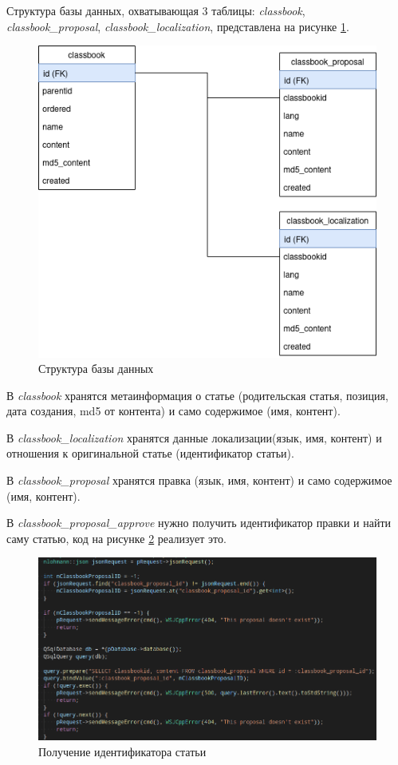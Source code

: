 Структура базы данных, охватывающая 3 таблицы: \emph{classbook}, \\ 
\emph{classbook\_proposal}, \emph{classbook\_localization}, представлена на рисунке \ref{fig:db_classbook}.

\begin{figure}[!h]
    \centering
    \includegraphics[width=0.6\linewidth]{images/db_classbook.png}
    \caption{Структура базы данных}
    \label{fig:db_classbook}
\end{figure}

В \emph{classbook} хранятся метаинформация о статье (родительская статья, позиция, 
дата создания, md5 от контента) и само содержимое (имя, контент).

В \emph{classbook\_localization} хранятся данные локализации(язык, имя, контент)
и отношения к оригинальной статье (идентификатор статьи).

В \emph{classbook\_proposal} хранятся правка (язык, имя, контент) и само содержимое (имя, контент).

В \emph{classbook\_proposal\_approve} нужно получить идентификатор правки и найти саму статью, 
код на рисунке \ref{fig:code_classbook_id} реализует это.

\begin{figure}[!h]
    \centering
    \includegraphics[width=0.8\linewidth]{images/code_classbook_id.png}
    \caption{Получение идентификатора статьи}
    \label{fig:code_classbook_id}
\end{figure}

